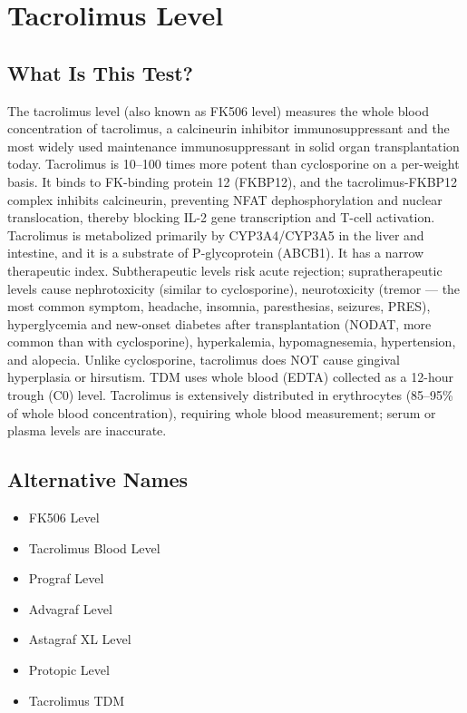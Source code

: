 \chapter{Tacrolimus Level}

\section*{What Is This Test?}
The tacrolimus level (also known as FK506 level) measures the whole blood concentration of tacrolimus, a calcineurin inhibitor immunosuppressant and the most widely used maintenance immunosuppressant in solid organ transplantation today. Tacrolimus is 10--100 times more potent than cyclosporine on a per-weight basis. It binds to FK-binding protein 12 (FKBP12), and the tacrolimus-FKBP12 complex inhibits calcineurin, preventing NFAT dephosphorylation and nuclear translocation, thereby blocking IL-2 gene transcription and T-cell activation. Tacrolimus is metabolized primarily by CYP3A4/CYP3A5 in the liver and intestine, and it is a substrate of P-glycoprotein (ABCB1). It has a narrow therapeutic index. Subtherapeutic levels risk acute rejection; supratherapeutic levels cause nephrotoxicity (similar to cyclosporine), neurotoxicity (tremor --- the most common symptom, headache, insomnia, paresthesias, seizures, PRES), hyperglycemia and new-onset diabetes after transplantation (NODAT, more common than with cyclosporine), hyperkalemia, hypomagnesemia, hypertension, and alopecia. Unlike cyclosporine, tacrolimus does NOT cause gingival hyperplasia or hirsutism. TDM uses whole blood (EDTA) collected as a 12-hour trough (C0) level. Tacrolimus is extensively distributed in erythrocytes (85--95\% of whole blood concentration), requiring whole blood measurement; serum or plasma levels are inaccurate.

\section*{Alternative Names}
\begin{itemize}
  \item FK506 Level
  \item Tacrolimus Blood Level
  \item Prograf Level
  \item Advagraf Level
  \item Astagraf XL Level
  \item Protopic Level
  \item Tacrolimus TDM
\end{itemize}
